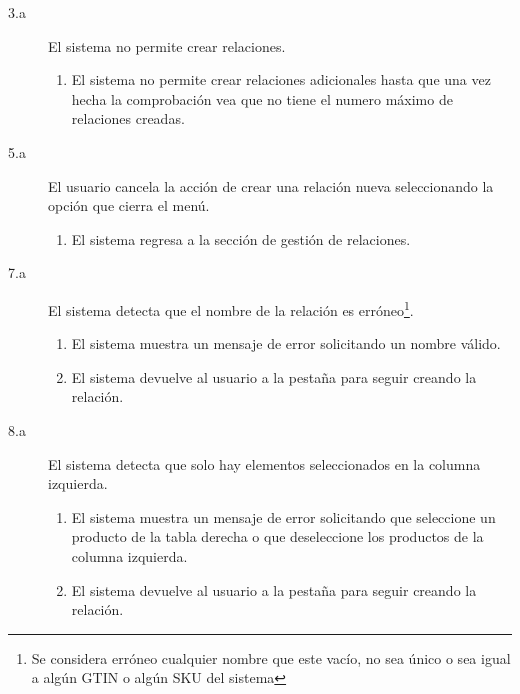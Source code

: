 \begin{description}

    \item[3.a] El sistema no permite crear relaciones.
    \begin{enumerate}
        \item[3.a.1] El sistema no permite crear relaciones adicionales hasta que una vez hecha la comprobación vea que no tiene el numero máximo de relaciones creadas.
    \end{enumerate}

    \item[5.a] El usuario cancela la acción de crear una relación nueva seleccionando la opción que cierra el menú.
    \begin{enumerate}
        \item[5.a.1] El sistema regresa a la sección de gestión de relaciones.
    \end{enumerate}

    \item[7.a] El sistema detecta que el nombre de la relación es erróneo\footnote{Se considera erróneo cualquier nombre que este vacío, no sea único o sea igual a algún GTIN o algún SKU del sistema}.
    \begin{enumerate}
        \item[7.a.1] El sistema muestra un mensaje de error solicitando un nombre válido.
        \item[7.a.2] El sistema devuelve al usuario a la pestaña para seguir creando la relación.
    \end{enumerate}

    \item[8.a] El sistema detecta que solo hay elementos seleccionados en la columna izquierda.
    \begin{enumerate}
        \item[8.a.1] El sistema muestra un mensaje de error solicitando que seleccione un producto de la tabla derecha o que deseleccione los productos de la columna izquierda.
        \item[8.a.2] El sistema devuelve al usuario a la pestaña para seguir creando la relación.
    \end{enumerate}
\end{description}

